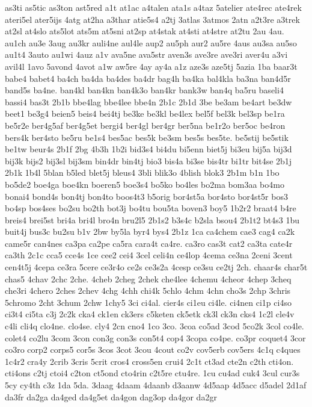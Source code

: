 {as3ti
as5tic
as3ton
ast5red
a1t
at1ac
a4talen
ata1s
a4taz
5atelier
ate4rec
ate4rek
ateri5el
ater5ijs
4atg
at2ha
a3thar
atie5s4
a2tj
3atlas
3atmos
2atn
a2t3re
a3trek
at2sl
at4slo
ats5lot
ats5m
at5sni
at2sp
at4stak
at4sti
at4stre
at2tu
2au
4au.
au1ch
au3e
3aug
au3kr
auli4ne
aul4le
aup2
au5ph
aur2
au5re
4aus
au3sa
au5so
au1t4
3auto
au1wi
4auz
a1v
ava5ne
ava5str
aven3s
ave3re
ave3ri
aver4u
a3vi
avil4l
1avo
5avond
4avot
a1w
aw5re
4ay
ay4a
a1z
aze3s
aze5tj
5azia
1ba
baar3t
babe4
babet4
ba4ch
ba4da
ba4des
ba4dr
bag4h
ba4ka
bal4kla
ba3na
ban4d5r
band5s
ba4ne.
ban4kl
ban4kn
ban4k3o
ban4kr
bank3w
ban4q
ba5ru
baseli4
bassi4
bas3t
2b1b
bbe4lag
bbe4lee
bbe4n
2b1c
2b1d
3be
be3am
be4art
be3dw
beet1
be3g4
beien5
beis4
bei4tj
be3ke
be3kl
be4lex
bel5f
bel3k
bel3sp
be1ra
be5r2e
ber4g5af
ber4g5et
bergi4
ber4gl
ber4gr
ber5na
be1r2o
ber5oc
be4ron
bers4k
ber4sto
be5ru
be1s4
bes5ac
bes5k
be3sm
bes5s
bes5te.
be5stij
be5stik
be1tw
beur4s
2b1f
2bg
4b3h
1b2i
bid3s4
bi4du
bi5enn
biet5j
bi3eu
bij5a
bij3d
bij3k
bijs2
bij3sl
bij3sm
bin4dr
bin4tj
bio3
bis4a
bi3se
bis4tr
bi1tr
bit4se
2b1j
2b1k
1b4l
5blan
b5led
blet5j
bleus4
3bli
blik3o
4blish
blok3
2b1m
b1n
1bo
bo5de2
boe4ga
boe4kn
boeren5
boe3s4
bo5ko
bo4les
bo2ma
bom3aa
bo4mo
bonai4
bond4s
bon4tj
bon4to
boos4t3
b5orig
bor4st5a
bor4sto
bor4st5r
bos3
bo4sp
bos4ses
bo2su
bo2th
bot3j
bo4tu
bou5ta
boven3
boy5
1b2r2
braat4
b4re
breis4
brei5st
bri4a
bri4l
bro4n
bru2l5
2b1s2
b3s4c
b2sla
bsou4
2b1t2
bt4s3
1bu
buit4j
bus3c
bu2su
b1v
2bw
by5la
byr4
bys4
2b1z
1ca
ca4chem
cae3
cag4
ca2k
came5r
can4nes
ca3pa
ca2pe
ca5ra
cara4t
ca4re.
ca3ro
cas3t
cat2
ca3ta
cate4r
ca3th
2c1c
cca5
cce4s
1ce
cee2
cei4
3cel
celi4n
ce4lop
4cema
ce3na
2ceni
3cent
cen4t5j
4cepa
ce3ra
5cere
ce3r4o
ce2s
ce3s2a
4cesp
ce3su
ce2tj
2ch.
chaar4s
char5t
chas5
4chav
2chc
2che.
4cheb
2cheg
2chek
che4lee
4chemu
4cheor
4chep
3cheq
che3ri
4chero
2ches
2chev
4chg
4chh
chi4k
5chlo
4chm
4chn
cho3s
2chp
3chris
5chromo
2cht
3chum
2chw
1chy5
3ci
ci4al.
cier4s
ci1eu
ci4le.
ci4nen
ci1p
ci4so
ci3t4
ci5ta
c3j
2c2k
cka4
ck1en
ck3ers
c5keten
ck5etk
ck3l
ck3n
cks4
1c2l
cle4v
c4li
cli4q
clo4ne.
clo4se.
cly4
2cn
cno4
1co
3co.
3coa
co5ad
3cod
5co2k
3col
co4le.
colet4
co2lu
3com
3con
con3g
con3s
con5t4
cop4
3copa
co4pe.
co3pr
coquet4
3cor
co3ro
corp2
corps5
cor5s
3cos
3cot
3cou
4cout
co2v
cov5erb
cov5ers
4c1q
c4ques
1c4r2
cra4y
2crib
3cris
5crit
cros4
cross5en
crui4
2c1t
ct3ad
cte2n
c2th
cti4on.
cti4ons
c2tj
ctoi4
c2ton
ct5ond
cto4rin
c2t5re
ctu4re.
1cu
cu4ad
cuk4
3cul
cur3s
5cy
cy4th
c3z
1da
5da.
3daag
4daam
4daanb
d3aanw
4d5aap
4d5acc
d5adel
2d1af
da3fr
da2ga
da4ged
da4g5et
da4gon
dag3op
da4gor
da2gr
}
